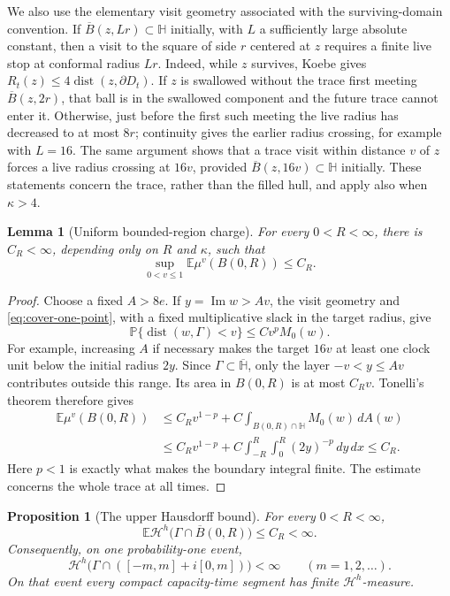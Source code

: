 \documentclass[11pt]{article}
\newtheorem{lemma}[theorem]{Lemma}
\newtheorem{proposition}[theorem]{Proposition}
\theoremstyle{definition}
\theoremstyle{remark}
\numberwithin{equation}{section}
\begin{document}
We also use the elementary visit geometry associated with the
surviving-domain convention.  If \(\overline B(z,Lr)\subset\mathbb H\)
initially, with \(L\) a sufficiently large absolute constant, then a
visit to the square of side \(r\) centered at \(z\) requires a finite
live stop at conformal radius \(Lr\).  Indeed, while \(z\) survives,
Koebe gives
\(R_t(z)\le4\operatorname{dist}(z,\partial D_t)\).
If \(z\) is swallowed without the trace first meeting
\(\overline B(z,2r)\), that ball is in the swallowed component and
the future trace cannot enter it.  Otherwise, just before the first
such meeting the live radius has decreased to at most \(8r\);
continuity gives the earlier radius crossing, for example with
\(L=16\).  The same argument shows that a trace visit within
distance \(v\) of \(z\) forces a live radius crossing at \(16v\),
provided \(\overline B(z,16v)\subset\mathbb H\) initially.
These statements concern the trace, rather
than the filled hull, and apply also when \(\kappa>4\).

\begin{lemma}[Uniform bounded-region charge]
\label{lem:cover-charge}
For every \(0<R<\infty\), there is \(C_R<\infty\), depending only on
\(R\) and \(\kappa\), such that
\[
 \sup_{0<v\le1}\mathbb E\mu^v(B(0,R))\le C_R.
\]
\end{lemma}

\begin{proof}
Choose a fixed \(A>8e\).  If \(y=\operatorname{Im}w>Av\),
the visit geometry and \eqref{eq:cover-one-point}, with a fixed
multiplicative slack in the target radius, give
\[
 \mathbb P\{\operatorname{dist}(w,\Gamma)<v\}
       \le C v^p M_0(w).
\]
For example, increasing \(A\) if necessary makes the target
\(16v\) at least one clock unit below the initial radius \(2y\).
Since \(\Gamma\subset\overline{\mathbb H}\), only the layer
\(-v<y\le Av\) contributes outside this range.  Its area in
\(B(0,R)\) is at most \(C_Rv\).  Tonelli's theorem therefore gives
\begin{align*}
 \mathbb E\mu^v(B(0,R))
 &\le C_Rv^{1-p}
       +C\int_{B(0,R)\cap\mathbb H}M_0(w)\,dA(w)\\
 &\le C_Rv^{1-p}
       +C\int_{-R}^{R}\int_0^R(2y)^{-p}\,dy\,dx
 \le C_R.
\end{align*}
Here \(p<1\) is exactly what makes the boundary integral finite.
The estimate concerns the whole trace at all times.
\end{proof}

\begin{proposition}[The upper Hausdorff bound]
\label{prop:dense-cover-upper}
For every \(0<R<\infty\),
\begin{equation}
 \mathbb E\mathcal H^h
       \bigl(\Gamma\cap\overline B(0,R)\bigr)\le C_R<\infty.
 \label{eq:cover-all-time-expectation}
\end{equation}
Consequently, on one probability-one event,
\[
 \mathcal H^h\bigl(\Gamma\cap([-m,m]+i[0,m])\bigr)<\infty
       \qquad(m=1,2,\ldots).
\]
On that event every compact capacity-time segment has finite
\(\mathcal H^h\)-measure.
\end{proposition}
\end{document}
